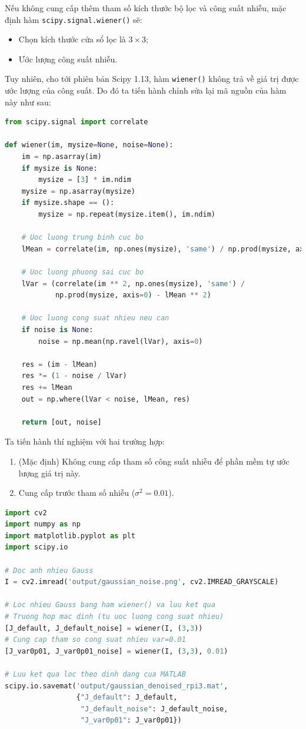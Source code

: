 Nếu không cung cấp thêm tham số kích thước bộ lọc và công suất nhiễu,
mặc định hàm \texttt{scipy.signal.wiener()} sẽ:
\begin{itemize}
    \item Chọn kích thước cửa sổ lọc là $3 \times 3$;
    \item Ước lượng công suất nhiễu.
\end{itemize}

Tuy nhiên, cho tới phiên bản Scipy 1.13, hàm \texttt{wiener()} không trả về giá trị được ước lượng của công suất.
Do đó ta tiến hành chỉnh sửa lại mã nguồn của hàm này như sau:

\begin{lstlisting}[language=Python]
from scipy.signal import correlate

def wiener(im, mysize=None, noise=None):
    im = np.asarray(im)
    if mysize is None:
        mysize = [3] * im.ndim
    mysize = np.asarray(mysize)
    if mysize.shape == ():
        mysize = np.repeat(mysize.item(), im.ndim)

    # Uoc luong trung binh cuc bo
    lMean = correlate(im, np.ones(mysize), 'same') / np.prod(mysize, axis=0)

    # Uoc luong phuong sai cuc bo
    lVar = (correlate(im ** 2, np.ones(mysize), 'same') /
            np.prod(mysize, axis=0) - lMean ** 2)

    # Uoc luong cong suat nhieu neu can
    if noise is None:
        noise = np.mean(np.ravel(lVar), axis=0)

    res = (im - lMean)
    res *= (1 - noise / lVar)
    res += lMean
    out = np.where(lVar < noise, lMean, res)

    return [out, noise]
\end{lstlisting}


Ta tiến hành thí nghiệm với hai trường hợp:
\begin{enumerate}
    \item (Mặc định) Không cung cấp tham số công suất nhiễu để phần mềm tự ước lượng giá trị này.
    \item Cung cấp trước tham số nhiễu ($\sigma^2 = 0.01$).
\end{enumerate}

\begin{lstlisting}[language=Python]
import cv2
import numpy as np
import matplotlib.pyplot as plt
import scipy.io

# Doc anh nhieu Gauss
I = cv2.imread('output/gaussian_noise.png', cv2.IMREAD_GRAYSCALE)

# Loc nhieu Gauss bang ham wiener() va luu ket qua
# Truong hop mac dinh (tu uoc luong cong suat nhieu)
[J_default, J_default_noise] = wiener(I, (3,3))
# Cung cap tham so cong suat nhieu var=0.01
[J_var0p01, J_var0p01_noise] = wiener(I, (3,3), 0.01)

# Luu ket qua loc theo dinh dang cua MATLAB
scipy.io.savemat('output/gaussian_denoised_rpi3.mat', 
                 {"J_default": J_default, 
                  "J_default_noise": J_default_noise,
                  "J_var0p01": J_var0p01})
\end{lstlisting}

